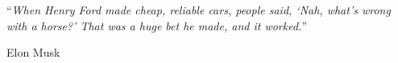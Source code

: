 
\vspace*{0.2\textheight}

\noindent\enquote{\itshape When Henry Ford made cheap, reliable cars, people said, ‘Nah, what’s wrong with a horse?’ That was a huge bet he made, and it worked.}\bigbreak

\hfill Elon Musk
